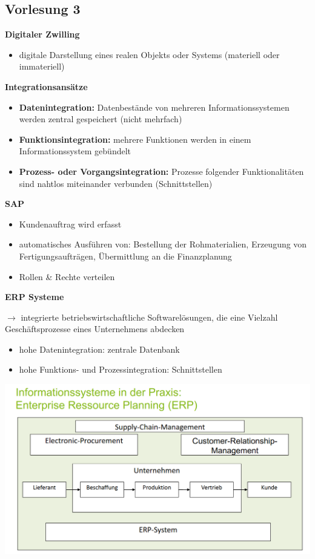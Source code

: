 \documentclass[a4]{scrartcl}
\begin{document}
\subsection*{Vorlesung 3}

\textbf{Digitaler Zwilling}

\begin{itemize}
\item digitale Darstellung eines realen Objekts oder Systems (materiell oder immateriell)
\end{itemize}

\textbf{Integrationsansätze}

\begin{itemize}
\item \textbf{Datenintegration:} Datenbestände von mehreren Informationssystemen werden zentral gespeichert (nicht mehrfach)
\item \textbf{Funktionsintegration:} mehrere Funktionen werden in einem Informationssystem gebündelt
\item \textbf{Prozess- oder Vorgangsintegration:} Prozesse folgender Funktionalitäten sind nahtlos miteinander verbunden (Schnittstellen)
\end{itemize}

\textbf{SAP}
\begin{itemize}
\item Kundenauftrag wird erfasst
\item automatisches Ausführen von: Bestellung der Rohmaterialien, Erzeugung von Fertigungsaufträgen, Übermittlung an die Finanzplanung
\item Rollen \& Rechte verteilen
\end{itemize}

\textbf{ERP Systeme}

$\rightarrow$ integrierte betriebswirtschaftliche Softwarelösungen, die eine Vielzahl Geschäftsprozesse eines Unternehmens abdecken
\begin{itemize}
\item hohe Datenintegration: zentrale Datenbank
\item hohe Funktions- und Prozessintegration: Schnittstellen
\end{itemize}

\includegraphics[scale=0.3]{digi_pic.png}
\end{document}
